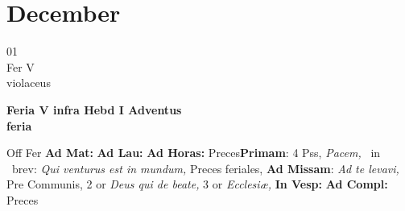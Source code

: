 \documentclass[10pt, openany]{book}
\begin{document}
        \chapter{December}
                        
        \begin{center}
            \begin{minipage}{3.5in}
                \vspace{2em}
                \begin{minipage}{0.5in}
                    {\Huge 01} \\
                    {\normalsize Fer V} \\
                    {\normalsize violaceus}
                \end{minipage}
                \begin{minipage}{3.0in}
                    \textbf{ \large Feria V infra Hebd I Adventus \\
                    \textnormal{\normalsize feria}} \\ 
                \end{minipage}
                \begin{justify}Off Fer
                    \textbf{Ad Mat: }
                    \textbf{Ad Lau: }
                    \textbf{Ad Horas: }Preces\textbf{Primam}: 4 Pss, \textit{Pacem,} \Vbar\ in \Rbar\ brev: \textit{Qui venturus est in mundum,} Preces feriales, \textbf{Ad Missam}: \textit{Ad te levavi,} Pre Communis, 2 or \textit{Deus qui de beate,} 3 or \textit{Ecclesiæ,}  
                    \textbf{In Vesp: }
                    \textbf{Ad Compl: }Preces
                \end{justify}
            \end{minipage}
        \end{center}
    
\end{document}
